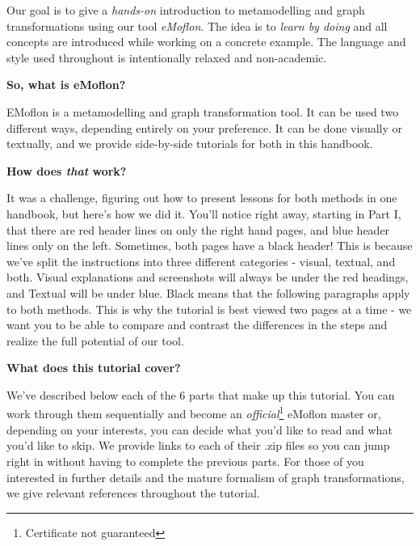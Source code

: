 Our goal is to give a \emph{hands-on} introduction to metamodelling and graph transformations using our tool \emph{eMoflon}. The idea is to \emph{learn by doing} and all concepts are introduced while working on a concrete example. The language and style used throughout is intentionally relaxed and non-academic.

{\bf \large So, what is eMoflon?}

EMoflon is a metamodelling and graph transformation tool. It can be used two different ways, depending entirely on your preference. It can be done visually or textually, and we provide side-by-side tutorials for both in this handbook.

{\bf \large How does \emph{that} work?}

It was a challenge, figuring out how to present lessons for both methods in one handbook, but here's how we did it. You'll notice right away, starting in Part I, that there are red header lines on only the right hand pages, and blue header lines only on the left. Sometimes, both pages have a black header! This is because we've split the instructions into three different categories - visual, textual, and both. Visual explanations and screenshots will always be under the red headings, and Textual will be under blue. Black means that the following paragraphs apply to both methods. This is why the tutorial is best viewed two pages at a time - we want you to be able to compare and contrast the differences in the steps and realize the full potential of our tool.

{\bf \large What does this tutorial cover?}

We've described below each of the 6 parts that make up this tutorial. You can work through them sequentially and become an \emph{official}\footnote{Certificate not guaranteed} eMoflon master or, depending on your interests, you can decide what you'd like to read and what you'd like to skip. We provide links to each of their .zip files so you can jump right in without having to complete the previous parts. For those of you interested in further details and the mature formalism of graph transformations, we give relevant references throughout the tutorial.

